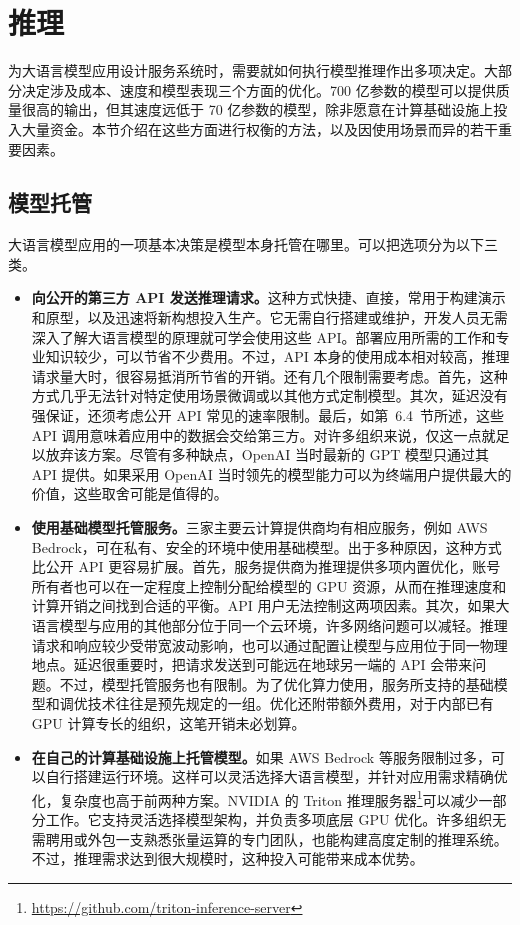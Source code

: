 \section{推理}
\label{sec:ch08-inference}
为大语言模型应用设计服务系统时，需要就如何执行模型推理作出多项决定。大部分决定涉及成本、速度和模型表现三个方面的优化。700 亿参数的模型可以提供质量很高的输出，但其速度远低于 70 亿参数的模型，除非愿意在计算基础设施上投入大量资金。本节介绍在这些方面进行权衡的方法，以及因使用场景而异的若干重要因素。

\subsection{模型托管}
大语言模型应用的一项基本决策是模型本身托管在哪里。可以把选项分为以下三类。

\begin{itemize}
\item \textbf{向公开的第三方 API 发送推理请求。}这种方式快捷、直接，常用于构建演示和原型，以及迅速将新构想投入生产。它无需自行搭建或维护，开发人员无需深入了解大语言模型的原理就可学会使用这些 API。部署应用所需的工作和专业知识较少，可以节省不少费用。不过，API 本身的使用成本相对较高，推理请求量大时，很容易抵消所节省的开销。还有几个限制需要考虑。首先，这种方式几乎无法针对特定使用场景微调或以其他方式定制模型。其次，延迟没有强保证，还须考虑公开 API 常见的速率限制。最后，如第~6.4~节所述，这些 API 调用意味着应用中的数据会交给第三方。对许多组织来说，仅这一点就足以放弃该方案。尽管有多种缺点，OpenAI 当时最新的 GPT 模型只通过其 API 提供。如果采用 OpenAI 当时领先的模型能力可以为终端用户提供最大的价值，这些取舍可能是值得的。

\item \textbf{使用基础模型托管服务。}三家主要云计算提供商均有相应服务，例如 AWS Bedrock，可在私有、安全的环境中使用基础模型。出于多种原因，这种方式比公开 API 更容易扩展。首先，服务提供商为推理提供多项内置优化，账号所有者也可以在一定程度上控制分配给模型的 GPU 资源，从而在推理速度和计算开销之间找到合适的平衡。API 用户无法控制这两项因素。其次，如果大语言模型与应用的其他部分位于同一个云环境，许多网络问题可以减轻。推理请求和响应较少受带宽波动影响，也可以通过配置让模型与应用位于同一物理地点。延迟很重要时，把请求发送到可能远在地球另一端的 API 会带来问题。不过，模型托管服务也有限制。为了优化算力使用，服务所支持的基础模型和调优技术往往是预先规定的一组。优化还附带额外费用，对于内部已有 GPU 计算专长的组织，这笔开销未必划算。

\item \textbf{在自己的计算基础设施上托管模型。}如果 AWS Bedrock 等服务限制过多，可以自行搭建运行环境。这样可以灵活选择大语言模型，并针对应用需求精确优化，复杂度也高于前两种方案。NVIDIA 的 Triton 推理服务器\footnote{\url{https://github.com/triton-inference-server}}可以减少一部分工作。它支持灵活选择模型架构，并负责多项底层 GPU 优化。许多组织无需聘用或外包一支熟悉张量运算的专门团队，也能构建高度定制的推理系统。不过，推理需求达到很大规模时，这种投入可能带来成本优势。
\end{itemize}

